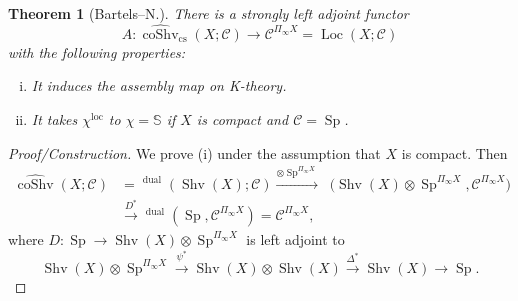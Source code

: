 \documentclass[draft]{amsart}
\renewcommand{\SS}{\mathbb{S}}
\newcommand{\ul}[1]{\underline{#1}}
\newcommand{\wh}[1]{\widehat{#1}}
\newcommand{\cat}[1]{\mathcal{#1}}
\DeclareMathOperator{\coShv}{coShv}
\DeclareMathOperator{\Shv}{Shv}
\DeclareMathOperator{\Sp}{Sp}
\DeclareMathOperator{\iHom}{\ul{Hom}}
\DeclareMathOperator{\Loc}{Loc}
\newtheorem{thm}{Theorem}[section]
\theoremstyle{definition}
\begin{document}
\begin{thm}[Bartels--N.]
There is a strongly left adjoint functor 
\[
A\colon \wh{\coShv}_{\mathrm{cs}}(X;\cat C) \to \cat C^{\Pi_\infty X} = \Loc(X;\cat C)
\]
with the following properties:
\begin{enumerate}[(i)]
\item It induces the assembly map on K-theory.
\item It takes $\chi^{\mathrm{loc}}$ to $\chi = \SS$ if $X$ is compact and $\cat C = \Sp$.
\end{enumerate}
\end{thm}
\begin{proof}[Proof/Construction]
We prove (i) under the assumption that $X$ is compact. Then
\begin{align*}
\wh{\coShv}(X;\cat C) &= \iHom^{\mathrm{dual}}(\Shv(X);\cat C) \xrightarrow{\otimes \Sp^{\Pi_\infty X}} \iHom\bigl(\Shv(X)\otimes \Sp^{\Pi_\infty X}, \cat C^{\Pi_\infty X}\bigr) \\
&\xrightarrow{D^*} \iHom^{\mathrm{dual}}(\Sp, \cat C^{\Pi_\infty X}) = \cat C^{\Pi_\infty X},
\end{align*}
where $D\colon \Sp \to \Shv(X)\otimes \Sp^{\Pi_\infty X}$ is left adjoint to
\[
\Shv(X)\otimes \Sp^{\Pi_\infty X} \xrightarrow{\psi^*} \Shv(X) \otimes \Shv(X)\xrightarrow{\Delta^*} \Shv(X) \to \Sp.
\]
\end{proof}
\end{document}
